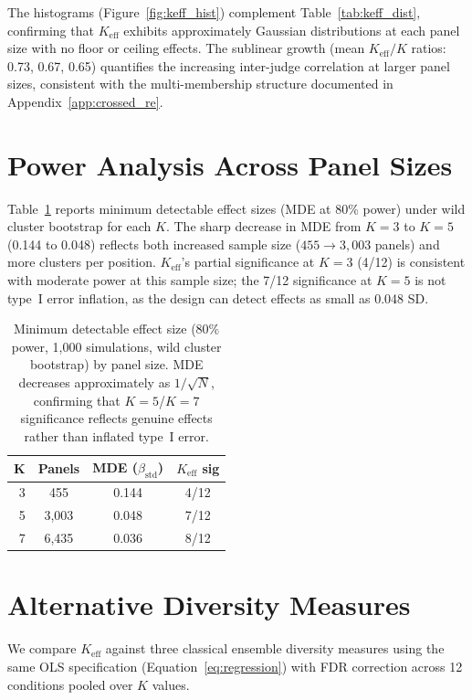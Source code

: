 The histograms (Figure~\ref{fig:keff_hist}) complement Table~\ref{tab:keff_dist}, confirming that $K_{\mathrm{eff}}$ exhibits approximately Gaussian distributions at each panel size with no floor or ceiling effects. The sublinear growth (mean $K_{\mathrm{eff}}/K$ ratios: 0.73, 0.67, 0.65) quantifies the increasing inter-judge correlation at larger panel sizes, consistent with the multi-membership structure documented in Appendix~\ref{app:crossed_re}.

\FloatBarrier
\section{Power Analysis Across Panel Sizes}
\label{app:power_analysis}

Table~\ref{tab:mde} reports minimum detectable effect sizes (MDE at 80\% power) under wild cluster bootstrap for each $K$. The sharp decrease in MDE from $K{=}3$ to $K{=}5$ (0.144 to 0.048) reflects both increased sample size ($455 \to 3{,}003$ panels) and more clusters per position. $K_{\mathrm{eff}}$'s partial significance at $K{=}3$ (4/12) is consistent with moderate power at this sample size; the 7/12 significance at $K{=}5$ is not type~I error inflation, as the design can detect effects as small as 0.048 SD.

\begin{table}[h]
\centering
\small
\caption{Minimum detectable effect size (80\% power, 1{,}000 simulations, wild cluster bootstrap) by panel size. MDE decreases approximately as $1/\sqrt{N}$, confirming that $K{=}5$/$K{=}7$ significance reflects genuine effects rather than inflated type~I error.}
\label{tab:mde}
\begin{tabular}{rccc}
\toprule
$\boldsymbol{K}$ & \textbf{Panels} & \textbf{MDE ($\beta_{\mathrm{std}}$)} & \textbf{$K_{\mathrm{eff}}$ sig} \\
\midrule
3 & 455     & 0.144 & 4/12 \\
5 & 3{,}003 & 0.048 & 7/12 \\
7 & 6{,}435 & 0.036 & 8/12 \\
\bottomrule
\end{tabular}
\end{table}

\FloatBarrier
\section{Alternative Diversity Measures}
\label{app:alt_diversity}

We compare $K_{\mathrm{eff}}$ against three classical ensemble diversity measures using the same OLS specification (Equation~\ref{eq:regression}) with FDR correction across 12 conditions pooled over $K$ values.

